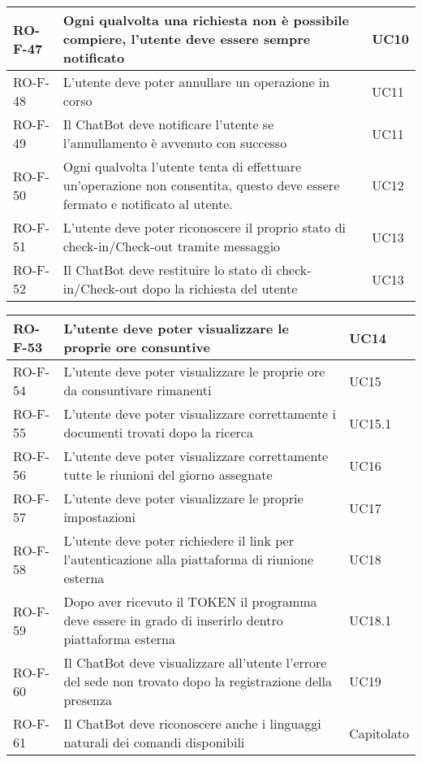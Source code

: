 \begin{center}
\begin{tabular}{ | m{8em} | m{18em} | m{12em} | }
RO-F-47&Ogni qualvolta una richiesta non è possibile compiere, l’utente deve essere sempre notificato &UC10 \\
\hline
RO-F-48&L’utente deve poter annullare un operazione in corso &UC11 \\
\hline
RO-F-49&Il ChatBot deve notificare l’utente se l’annullamento è avvenuto con successo &UC11 \\
\hline
RO-F-50&Ogni qualvolta l’utente tenta di effettuare un’operazione non consentita, questo deve essere fermato e notificato al utente.&UC12 \\
\hline
RO-F-51&L’utente deve poter riconoscere il proprio stato di check-in/Check-out tramite messaggio &UC13 \\
\hline
RO-F-52&Il ChatBot deve restituire lo stato di check-in/Check-out dopo la richiesta del utente &UC13\\
\hline
\end{tabular}
\newpage
\begin{tabular}{ | m{8em} | m{18em} | m{12em} | }
\hline
RO-F-53&L’utente deve poter visualizzare le proprie ore consuntive &UC14 \\
\hline
RO-F-54&L’utente deve poter visualizzare le proprie ore da consuntivare rimanenti &UC15 \\
\hline
RO-F-55&L’utente deve poter visualizzare correttamente i documenti trovati dopo la ricerca &UC15.1 \\
\hline
RO-F-56&L’utente deve poter visualizzare correttamente tutte le riunioni del giorno assegnate & UC16\\
\hline
RO-F-57&L’utente deve poter visualizzare le proprie impostazioni &UC17 \\
\hline
RO-F-58&L’utente deve poter richiedere il link per l’autenticazione alla piattaforma di riunione esterna &UC18 \\
\hline
RO-F-59&Dopo aver ricevuto il TOKEN il programma deve essere in grado di inserirlo dentro piattaforma esterna &UC18.1 \\
\hline
RO-F-60&Il ChatBot deve visualizzare all’utente l’errore del sede non trovato dopo la registrazione della presenza &UC19 \\
\hline
RO-F-61&Il ChatBot deve riconoscere anche i linguaggi naturali dei comandi disponibili &Capitolato \\
\hline
\end{tabular}
\end{center}

